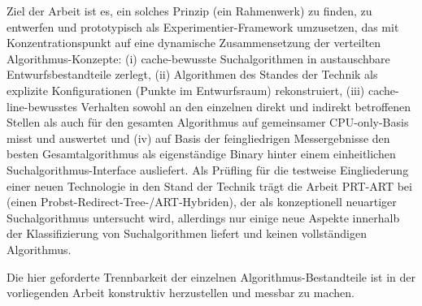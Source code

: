Ziel der Arbeit ist es, ein solches Prinzip (ein Rahmenwerk) zu finden, zu entwerfen und
prototypisch als Experimentier-Framework umzusetzen, das mit Konzentrationspunkt auf eine dynamische
Zusammensetzung der verteilten Algorithmus-Konzepte: (i) cache-bewusste Suchalgorithmen in
austauschbare Entwurfsbestandteile zerlegt, (ii) Algorithmen des Standes der Technik als explizite
Konfigurationen (Punkte im Entwurfsraum) rekonstruiert, (iii) cache-line-bewusstes Verhalten sowohl
an den einzelnen direkt und indirekt betroffenen Stellen als auch für den gesamten Algorithmus auf
gemeinsamer CPU-only-Basis misst und auswertet und (iv) auf Basis der feingliedrigen Messergebnisse
den besten Gesamtalgorithmus als eigenständige Binary hinter einem einheitlichen
Suchalgorithmus-Interface ausliefert. Als Prüfling für die testweise Eingliederung einer neuen
Technologie in den Stand der Technik trägt die Arbeit \mbox{PRT-ART} bei (einen
Probst-Redirect-Tree-/ART-Hybriden), der als konzeptionell neuartiger Suchalgorithmus untersucht
wird, allerdings nur einige neue Aspekte innerhalb der Klassifizierung von Suchalgorithmen liefert
und keinen vollständigen Algorithmus.

Die hier geforderte Trennbarkeit der einzelnen Algorithmus-Bestandteile ist in der vorliegenden
Arbeit konstruktiv herzustellen und messbar zu machen.

